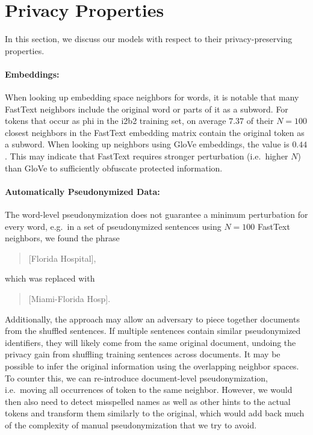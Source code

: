 \section{Privacy Properties}

In this section, we discuss our models with respect to their privacy-preserving properties.

\paragraph{Embeddings:}
%
When looking up embedding space neighbors for words, it is notable that many FastText neighbors include the original word or parts of it as a subword.
%
For tokens that occur as \ac{phi} in the i2b2 training set, on average $7.37$ of their $N=100$ closest neighbors in the FastText embedding matrix contain the original token as a subword.
%
When looking up neighbors using GloVe embeddings, the value is $0.44$.
%
This may indicate that FastText requires stronger perturbation (i.e.\ higher $N$) than GloVe to sufficiently obfuscate protected information.

\paragraph{Automatically Pseudonymized Data:}
%
The word-level pseudonymization does not guarantee a minimum perturbation for every word, e.g.\ in a set of pseudonymized sentences using $N = 100$ FastText neighbors, we found the phrase
%
\begin{quote}
    [Florida Hospital],
\end{quote}
%
which was replaced with
%
\begin{quote}
    [Miami-Florida Hosp].
\end{quote}

%
Additionally, the approach may allow an adversary to piece together documents from the shuffled sentences.
%
If multiple sentences contain similar pseudonymized identifiers, they will likely come from the same original document, undoing the privacy gain from shuffling training sentences across documents.
%
It may be possible to infer the original information using the overlapping neighbor spaces.
%
To counter this, we can re-introduce document-level pseudonymization, i.e.\ moving all occurrences of  token to the same neighbor.
%
However, we would then also need to detect misspelled names as well as other hints to the actual tokens and transform them similarly to the original, which would add back much of the complexity of manual pseudonymization that we try to avoid.

